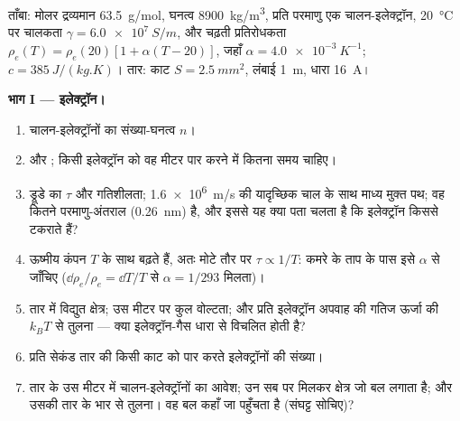 \begin{problem}[{सप्ताहांत समस्या --- घर के तार का एक मीटर, चार पैमानों पर
जाँचा गया: इलेक्ट्रॉन, स्थानिक नियम, परिपथ, और
विद्युत-लाइन}]
\label{pb:b2:charges-currents-conduction:1}

ताँबा: मोलर द्रव्यमान \qty{63.5}{g/mol}, घनत्व \qty{8900}{kg/m^3}, प्रति परमाणु एक
चालन-इलेक्ट्रॉन, \qty{20}{\degreeCelsius} पर चालकता $\gamma = \qty{6.0e7}{S/m}$,
और चढ़ती प्रतिरोधकता $\rho_e(T) = \rho_e(20)[1 +
\alpha(T - 20)]$, जहाँ $\alpha = \qty{4.0e-3}{K^{-1}}$; $c = \qty{385}{J/(kg.K)}$। तार:
काट $S = \qty{2.5}{mm^2}$, लंबाई \qty{1}{m}, धारा \qty{16}{A}।

\medskip
\noindent\textbf{भाग I --- इलेक्ट्रॉन।}
\begin{enumerate}
  \item चालन-इलेक्ट्रॉनों का संख्या-घनत्व $n$।
  \item {} और ; किसी इलेक्ट्रॉन को वह मीटर पार करने में
        कितना समय चाहिए।
  \item ड्रूडे का $\tau$ और गतिशीलता; \qty{1.6e6}{m/s} की यादृच्छिक
        चाल के साथ माध्य मुक्त पथ; वह कितने परमाणु-अंतराल (\qty{0.26}{nm})
        है, और इससे यह क्या पता चलता है कि इलेक्ट्रॉन किससे
        टकराते हैं?
  \item ऊष्मीय कंपन $T$ के साथ बढ़ते हैं, अतः मोटे तौर पर $\tau \propto 1/T$:
        कमरे के ताप के पास इसे $\alpha$ से जाँचिए ($\dd\rho_e/\rho_e =
        \dd T/T$ से $\alpha = 1/293$ मिलता)।
  \item तार में विद्युत क्षेत्र; उस मीटर पर कुल वोल्टता; और
        प्रति इलेक्ट्रॉन अपवाह की गतिज ऊर्जा की $k_BT$ से तुलना ---
        क्या इलेक्ट्रॉन-गैस धारा से विचलित होती है?
  \item प्रति सेकंड तार की किसी काट को पार करते इलेक्ट्रॉनों की संख्या।
  \item तार के उस मीटर में चालन-इलेक्ट्रॉनों का आवेश; उन सब पर मिलकर
        क्षेत्र जो बल लगाता है; और उसकी तार के भार से तुलना। वह बल
        कहाँ जा पहुँचता है (संघट्ट सोचिए)?
\end{enumerate}


\end{problem}
